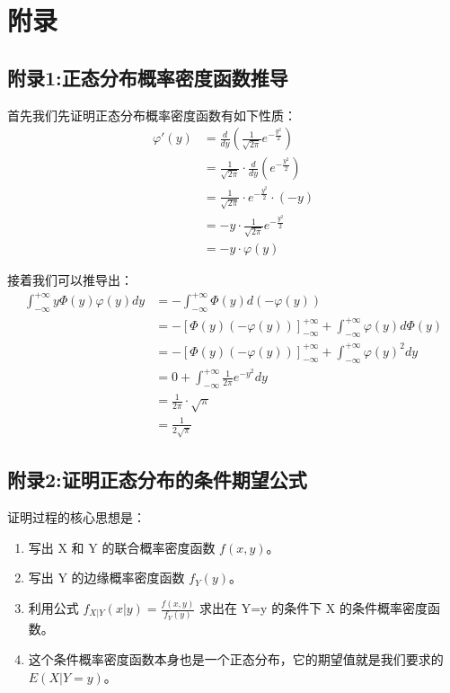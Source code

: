 \documentclass[UTF8]{ctexart}
\begin{document}
\section*{附录}

\subsection*{附录1:正态分布概率密度函数推导}
首先我们先证明正态分布概率密度函数有如下性质：
$$
\begin{align*}
    \varphi'(y) &= \frac{d}{dy}\left(\frac{1}{\sqrt{2\pi}}e^{-\frac{y^2}{2}}\right) \\
    &= \frac{1}{\sqrt{2\pi}} \cdot \frac{d}{dy}\left(e^{-\frac{y^2}{2}}\right) \\
    &= \frac{1}{\sqrt{2\pi}} \cdot e^{-\frac{y^2}{2}} \cdot \left(-y\right) \\
    &= -y \cdot \frac{1}{\sqrt{2\pi}}e^{-\frac{y^2}{2}} \\
    &= -y \cdot \varphi(y)
\end{align*}
$$

接着我们可以推导出：
$$
\begin{align*}
    \int_{-\infty}^{+\infty} y\Phi(y)\varphi(y)dy
    &= -\int_{-\infty}^{+\infty} \Phi(y)d(-\varphi(y)) \\
    &= -\left[\Phi(y)(-\varphi(y))\right]_{-\infty}^{+\infty} + \int_{-\infty}^{+\infty} \varphi(y)d\Phi(y) \\
    &= -\left[\Phi(y)(-\varphi(y))\right]_{-\infty}^{+\infty} + \int_{-\infty}^{+\infty} \varphi(y)^2 dy \\
    &= 0 + \int_{-\infty}^{+\infty} \frac{1}{2\pi}e^{-y^2} dy \\
    &= \frac{1}{2\pi} \cdot \sqrt{\pi} \\
    &= \frac{1}{2\sqrt{\pi}}
\end{align*}
$$

\subsection*{附录2:证明正态分布的条件期望公式}
\noindent 证明过程的核心思想是：
\begin{enumerate}
    \item 写出 X 和 Y 的联合概率密度函数 $f(x, y)$。
    \item 写出 Y 的边缘概率密度函数 $f_Y(y)$。
    \item 利用公式 $f_{X|Y}(x|y) = \frac{f(x, y)}{f_Y(y)}$ 求出在 Y=y 的条件下 X 的条件概率密度函数。
    \item 这个条件概率密度函数本身也是一个正态分布，它的期望值就是我们要求的 $E(X|Y=y)$。
\end{enumerate}
\end{document}
